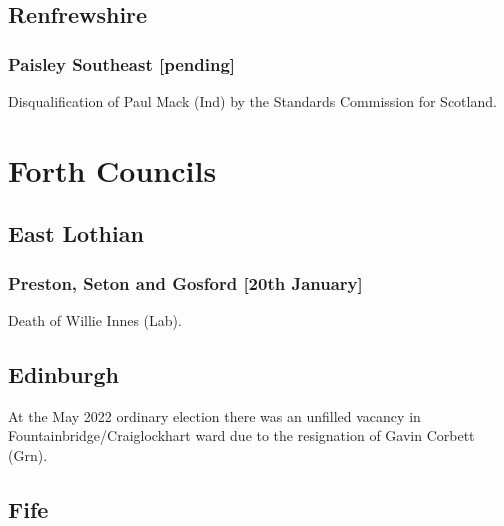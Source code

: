 \documentclass[a4paper,openany]{book}
\begin{document}
\begin{resultsiii}
\subsection*{Renfrewshire}

\subsubsection*{Paisley Southeast \hspace*{\fill}\nolinebreak[1]%
	\enspace\hspace*{\fill}
	[pending]}


Disqualification of Paul Mack (Ind) by the Standards Commission for Scotland.

\section{Forth Councils}

\subsection*{East Lothian}

\subsubsection*{Preston, Seton and Gosford \hspace*{\fill}\nolinebreak[1]%
	\enspace\hspace*{\fill}
	[20th January]}


Death of Willie Innes (Lab).

\subsection*{Edinburgh}

At the May 2022 ordinary election there was an unfilled vacancy in Fountainbridge\slash Craiglockhart ward due to the resignation of Gavin Corbett (Grn).%

\subsection*{Fife}


\end{resultsiii}
\end{document}
